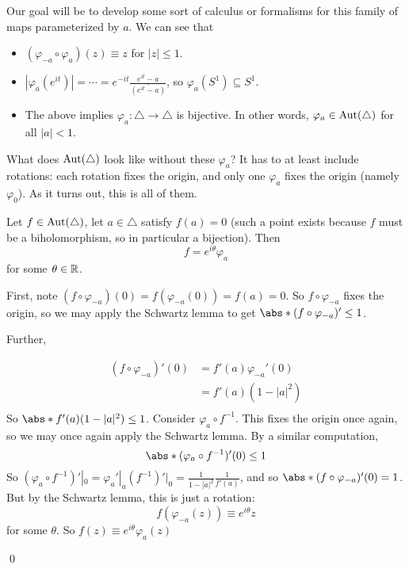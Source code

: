 \documentclass[x11names,reqno,14pt]{extarticle}
\newcommand{\bigt}{\bigtriangleup}
\begin{document}
Our goal will be to develop some sort of calculus or formalisms for this family of maps parameterized by $a$. We can see that
\begin{itemize}
\item $(\varphi_{-a} \circ \varphi_a)(z) \equiv z$ for $|z|\leq 1$. 
\item $|\varphi_a(e^{it})| = \cdots = e^{-it}\frac{e^{it} - a}{\bar{(e^{it} - a)}}$, so $\varphi_a(S^1) \subseteq S^1$. 
\item The above implies $\varphi_a:\bigt\to\bigt$ is bijective. In other words, $\varphi_a\in\Aut(\bigt)$ for all $|a| < 1$.  
\end{itemize}

What does $\Aut(\bigt)$ look like without these $\varphi_a$? It has to at least include rotations: each rotation fixes the origin, and only one $\varphi_a$ fixes the origin (namely $\varphi_0$). As it turns out, this is all of them. 

\thm

Let $f \in \Aut(\bigt)$, let $a \in \bigt$ satisfy $f(a) = 0$ (such a point exists because $f$ must be a biholomorphism, so in particular a bijection). Then
\[
f = e^{i\theta}\varphi_a
\]
for some $\theta\in \mathbb{R}$. 

\proof

First, note $(f\circ\varphi_{-a})(0) = f(\varphi_{-a}(0)) = f(a) = 0$. So $f\circ \varphi_{-a}$ fixes the origin, so we may apply the Schwartz lemma to get $\abs*{(f\circ\varphi_{-a})'} \leq 1$. 

Further, 

\begin{align*}
(f\circ\varphi_{-a})'(0) & = f'(a)\varphi_{-a}'(0) \\
								  & = f'(a)(1 - |a|^2) \\
\end{align*}
So $\abs*{f'(a)}(1 - |a|^2) \leq 1$. Consider $\varphi_a\circ f^{-1}$. This fixes the origin once again, so we may once again apply the Schwartz lemma. By a similar computation, 
\[
\abs*{(\varphi_a\circ f^{-1})'(0)} \leq 1
\]
So $(\varphi_a\circ f^{-1})'|_0 = \varphi_a'|_a(f^{-1})'|_0 = \frac{1}{1 - |a|^2}\frac{1}{f'(a)}$, and so $\abs*{(f\circ\varphi_{-a})'(0)} = 1$. But by the Schwartz lemma, this is just a rotation: 
\[
f(\varphi_{-a}(z)) \equiv e^{i\theta}z
\]
for some $\theta$. So $f(z) \equiv e^{i\theta}\varphi_a(z)$

\qed
\end{document}
